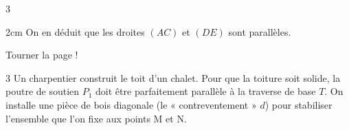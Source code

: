 \documentclass[a4paper]{book}
\begin{document}
{\begin{exerciceNote}{3}
\begin{enumerate}[leftmargin=*]
\begin{ZoneReponse}{2cm}
                On en déduit que les droites $(AC)$ et $(DE)$ sont parallèles.
            \end{ZoneReponse}
        \end{enumerate}
    \end{exerciceNote}


\vfill  \hfill Tourner la page !

\newpage

    \begin{exerciceNote}{3}
        Un charpentier construit le toit d'un chalet. Pour que la toiture soit solide, la poutre de soutien $P_1$ doit être parfaitement parallèle à la traverse de base $T$. On installe une pièce de bois diagonale (le « contreventement » $d$) pour stabiliser l'ensemble que l'on fixe aux points M et N.

        \begin{center}
        \end{center}
        

\end{exerciceNote}}
\end{document}
